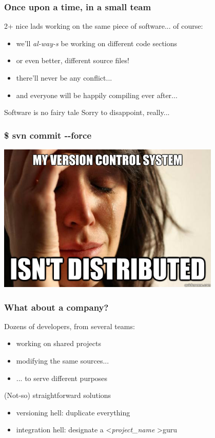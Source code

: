 \begin{frame}
  \frametitle{Once upon a time, in a small team}

  2+ nice lads working on the same piece of software... of course:
  \begin{itemize}
    \item we'll \textit{al-way-s} be working on different code sections
    \item or even better, different source files!
    \item there'll never be any conflict...
    \item and everyone will be happily compiling ever after...
  \end{itemize}
  \begin{block}{Software is no fairy tale}
    Sorry to disappoint, really...
  \end{block}
\end{frame}

\begin{frame}
  \frametitle{\$ svn commit -{}-force}
  \begin{center}
    \includegraphics[width=0.8\textwidth]{img/notdistributed.jpg}
  \end{center}
\end{frame}

\begin{frame}
  \frametitle{What about a company?}

  Dozens of developers, from several teams:
  \begin{itemize}
    \item working on shared projects
    \item modifying the same sources...
    \item ... to serve different purposes
  \end{itemize}
  \begin{block}{(Not-so) straightforward solutions}
    \begin{itemize}
      \item versioning hell: duplicate everything
      \item integration hell: designate a \textless \textit{project\_name} \textgreater guru
    \end{itemize}
  \end{block}
\end{frame}

